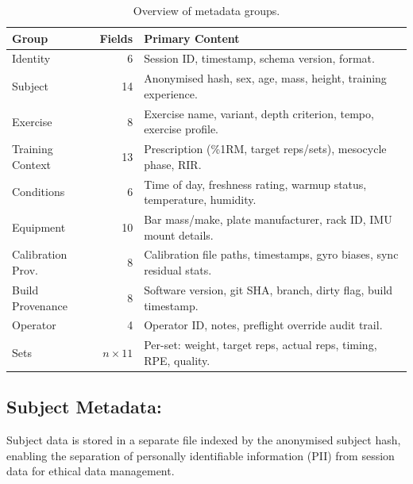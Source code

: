 \begin{table}[H]
  \centering
  \caption{Overview of  metadata groups.}
  \label{tab:metadata_groups}
  \begin{tabular}{lrl}
    \toprule
    \textbf{Group} & \textbf{Fields} & \textbf{Primary Content} \\
    \midrule
    Identity           & 6   & Session ID, timestamp, schema version, format. \\
    Subject            & 14  & Anonymised hash, sex, age, mass, height, training experience. \\
    Exercise           & 8   & Exercise name, variant, depth criterion, tempo, exercise profile. \\
    Training Context   & 13  & Prescription (\%1RM, target reps/sets), mesocycle phase, RIR. \\
    Conditions         & 6   & Time of day, freshness rating, warmup status, temperature, humidity. \\
    Equipment          & 10  & Bar mass/make, plate manufacturer, rack ID, IMU mount details. \\
    Calibration Prov.  & 8   & Calibration file paths, timestamps, gyro biases, sync residual stats. \\
    Build Provenance   & 8   & Software version, git SHA, branch, dirty flag, build timestamp. \\
    Operator           & 4   & Operator ID, notes, preflight override audit trail. \\
    Sets               & $n\times 11$ & Per-set: weight, target reps, actual reps, timing, RPE, quality. \\
    \bottomrule
  \end{tabular}
\end{table}


\subsection{Subject Metadata: }

Subject data is stored in a separate file indexed by the anonymised subject hash, enabling the separation of personally identifiable information (PII) from session data for ethical data management.


